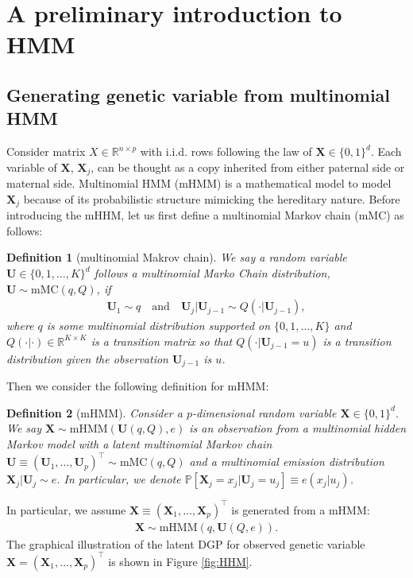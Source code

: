 \documentclass[12pt]{article}
\newtheorem{definition}{Definition}
\theoremstyle{definition}
\def\P{\mathbb{P}}
\def\P{\mathbb{P}}
\renewcommand{\P}{\mathbb{P}}							%
\newcommand{\prx}{\bm X}								%
\newcommand{\pru}{{\bm U}}								%
\begin{document}
\section{A preliminary introduction to HMM}\label{sec:HMM}


\subsection{Generating genetic variable from multinomial HMM}\label{sec:gen_snp}

Consider matrix $X\in\mathbb{R}^{n\times p}$ with i.i.d. rows following the law of $\prx\in\{0,1\}^d$. Each variable of $\prx$, $\prx_j$, can be thought as a copy inherited from either paternal side or maternal side. Multinomial HMM (mHMM) is a mathematical model to model $\prx_j$ because of its probabilistic structure mimicking the hereditary nature. Before introducing the mHHM, let us first define a multinomial Markov chain (mMC) as follows:

\begin{definition}[multinomial Makrov chain]\label{def:Markov_chain}
	We say a random variable $\pru\in\{0,1,\ldots,K\}^d$ follows a multinomial Marko Chain distribution, $\pru\sim \text{mMC}(q,Q)$, if 
	\begin{align*}
		\pru_1\sim q\quad\text{and}\quad \pru_{j}|\pru_{j-1}\sim Q(\cdot|\pru_{j-1}),
	\end{align*}
	where $q$ is some multinomial distribution supported on $\{0,1,\ldots,K\}$ and $Q(\cdot|\cdot)\in\mathbb{R}^{K\times K}$ is a transition matrix so that $Q(\cdot|\pru_{j-1}=u)$ is a transition distribution given the observation $\pru_{j-1}$ is $u$.
\end{definition}
Then we consider the following definition for mHMM:
\begin{definition}[mHMM]\label{def:mhhm}
	Consider a $p$-dimensional random variable $\bm X\in\{0,1\}^d$. We say $\bm X\sim \text{mHMM}(\pru(q,Q),e)$ is an observation from a multinomial hidden Markov model with a latent \textit{multinomial Markov chain} $\bm U\equiv (\pru_1,\ldots,\pru_p)^\top \sim \text{mMC}(q,Q)$ and a multinomial emission distribution $\bm X_j|\pru_j\sim e$. In particular, we denote $\P[\bm X_j=x_j|\pru_j=u_j]\equiv e(x_j|u_j)$.
\end{definition}
\noindent In particular, we assume $\prx\equiv (\prx_1,\ldots,\prx_p)^\top$ is generated from a mHMM:
\begin{align*}
	\prx\sim \text{mHMM}(q,\pru(Q,e)).
\end{align*}
The graphical illustration of the latent DGP for observed genetic variable $\prx=(\prx_1,\ldots,\prx_p)^\top$ is shown in Figure \ref{fig:HHM}.
\end{document}

